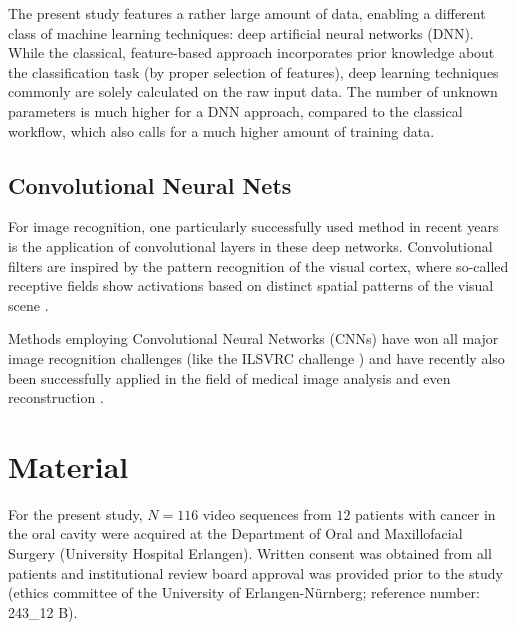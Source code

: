 \documentclass[fleqn,10pt]{wlscirep}
\begin{document}
The present study features a rather large amount of data, enabling
a different class of machine learning techniques: deep
artificial neural networks (DNN).
While the classical, feature-based
approach incorporates prior knowledge about the classification task
(by proper selection of features), deep learning techniques commonly
are solely calculated on the raw input data. The number of unknown
parameters is much higher for a DNN approach, compared to the
classical workflow, which also calls for a much higher amount of
training data.



\subsection{Convolutional Neural Nets}
For image recognition, one
particularly successfully used method in recent years is the
application of convolutional layers in these deep networks. Convolutional
filters are inspired by the pattern recognition of the
visual cortex, where so-called receptive fields show activations based
on distinct spatial patterns of the visual scene \cite{Hubel:1968ep}.


Methods employing Convolutional Neural Networks (CNNs) have won all
major image recognition challenges (like the ILSVRC challenge
\cite{Russakovsky:2015bu}) and have recently also been successfully
applied in the field of medical image analysis
\cite{Shin:2016cx,Roth:2016eg,Esteva:2017ct,Litjens:2016fr} and even reconstruction \cite{Wurfl:2016jq}.





\section{Material}
For the present study, $N=116$ video sequences from $12$ patients with cancer in
the oral cavity were acquired at the Department of Oral and Maxillofacial Surgery (University Hospital Erlangen). Written consent was obtained from all patients and institutional review board approval
was provided prior to the study (ethics committee of the University of Erlangen-N{\"u}rnberg; reference number: 243\_12 B).
\end{document}
